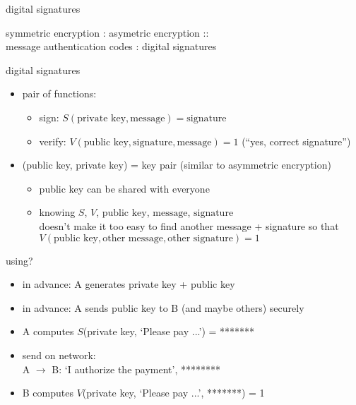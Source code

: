 \begin{frame}{digital signatures}

symmetric encryption : asymetric encryption :: \\
message authentication codes : digital signatures
\end{frame}

\begin{frame}{digital signatures}
    \begin{itemize}
    \item pair of functions:
        \begin{itemize}
        \item sign: $S(\text{private key}, \text{message}) = \text{signature}$
        \item verify: $V(\text{public key}, \text{signature}, \text{message}) = 1$ (``yes, correct signature'') 
        \end{itemize}
    \item (public key, private key) = key pair (similar to asymmetric encryption)
        \begin{itemize}
        \item public key can be shared with everyone
        \item knowing $S$, $V$, $\text{public key}$, $\text{message}$, $\text{signature}$ \\
            doesn't make it too easy to find another message + signature so that\\
            $V(\text{public key}, \text{other message}, \text{other signature}) = 1$
        \end{itemize}
    \end{itemize}
\end{frame}

\begin{frame}{using?}
    \begin{itemize}
    \item in advance: A generates private key + public key
    \item in advance: A sends public key to B (and maybe others) securely
    \vspace{.5cm}
    \item A computes $S$(private key, `Please pay ...') = *******
    \item send on network: \\
    A $\rightarrow$ B: `I authorize the payment', ********
    \item B computes $V$(private key, `Please pay ...', *******) = 1
    \end{itemize}
\end{frame}
